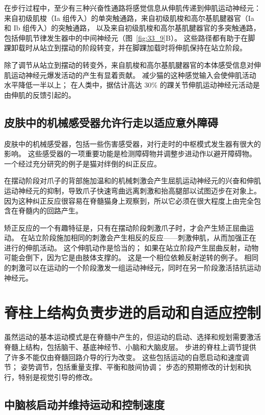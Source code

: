 在步行过程中，至少有三种兴奋性通路将感觉信息从伸肌传递到伸肌运动神经元：来自初级肌梭（Ia 组传入）的单突触通路，来自初级肌梭和高尔基肌腱器官（Ia 和 Ib 组传入）的突触通路， 以及来自初级肌梭和高尔基肌腱器官的多突触通路，包括伸肌节律发生器中的中间神经元（图~\ref{fig:33_9}B）。
这些路径都有助于在脚踝卸载时从站立到摆动的阶段转变，并在脚踝加载时将伸肌保持在站立阶段。


除了调节从站立到摆动的转变外，来自肌梭和高尔基肌腱器官的本体感受信息对伸肌运动神经元爆发活动的产生有显着贡献。
减少猫的这种感觉输入会使伸肌活动水平降低一半以上；
在人类中，据估计高达 30\% 的踝关节伸肌运动神经元活动是由伸肌的反馈引起的。



\subsection{皮肤中的机械感受器允许行走以适应意外障碍}

皮肤中的机械感受器，包括一些伤害感受器，对行走时的中枢模式发生器有很大的影响。
这些感受器的一项重要功能是检测障碍物并调整步进动作以避开障碍物。
一个经过充分研究的例子是猫对绊倒的纠正反应。


在摆动阶段对爪子的背部施加温和的机械刺激会产生屈肌运动神经元的兴奋和伸肌运动神经元的抑制，导致爪子快速弯曲远离刺激和抬高腿部以试图迈步在对象上。
因为这种纠正反应很容易在脊髓猫身上观察到，所以它必须在很大程度上由完全包含在脊髓内的回路产生。


矫正反应的一个有趣特征是，只有在摆动阶段刺激爪子时，才会产生矫正屈曲运动。
在站立阶段施加相同的刺激会产生相反的反应——刺激伸肌，从而加强正在进行的伸肌活动。
这个伸肌动作是恰当的；
如果在站立阶段产生屈曲反射，动物可能会倒下，因为它是由肢体支撑的。
这是一个相位依赖反射逆转的例子。
相同的刺激可以在运动的一个阶段激发一组运动神经元，同时在另一阶段激活拮抗运动神经元。



\section{脊柱上结构负责步进的启动和自适应控制}

虽然运动的基本运动模式是在脊髓中产生的，但运动的启动、选择和规划需要激活脊髓上结构，包括脑干、基底神经节、小脑和大脑皮层。
步进的脊柱上调节提供了许多不能仅由脊髓回路介导的行为改变。
这些包括运动的自愿启动和速度调节；
姿势调节，包括重量支撑、平衡和肢间协调；
步态的预期修改的计划和执行，特别是视觉引导的修改。



\subsection{中脑核启动并维持运动和控制速度}

